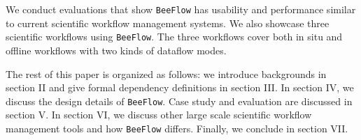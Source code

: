 We conduct evaluations that show \texttt{BeeFlow} has usability and performance similar to current scientific workflow management systems. We also showcase three scientific workflows using \texttt{BeeFlow}. The three workflows cover both in situ and offline workflows with two kinds of dataflow modes. 

The rest of this paper is organized as follows:  
we introduce backgrounds in section II and give formal dependency definitions in section III. In section IV, we discuss the design details of \texttt{BeeFlow}. Case study and evaluation are discussed in section V. In section VI, we discuss other large scale scientific workflow management tools and how \texttt{BeeFlow} differs. Finally, we conclude in section VII.





